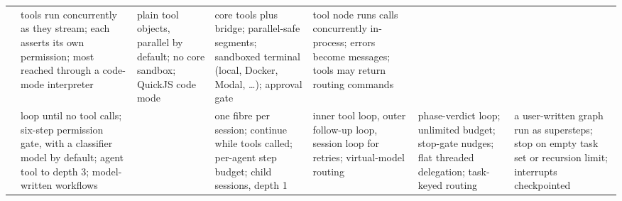 \begin{table}[p]
\begin{tabularx}{\linewidth}{@{}>{\bfseries}p{1.9cm}YYYYYY@{}}
 &
tools run concurrently as they stream; each asserts its own permission; most reached through a code-mode interpreter &
plain tool objects, parallel by default; no core sandbox; QuickJS code mode &
core tools plus bridge; parallel-safe segments; sandboxed terminal (local, Docker, Modal, \ldots); approval gate &
tool node runs calls concurrently in-process; errors become messages; tools may return routing commands \\
\addlinespace
{} &
loop until no tool calls; six-step permission gate, with a classifier model by default; agent tool to depth 3; model-written workflows &
 &
one fibre per session; continue while tools called; per-agent step budget; child sessions, depth 1 &
inner tool loop, outer follow-up loop, session loop for retries; virtual-model routing &
phase-verdict loop; unlimited budget; stop-gate nudges; flat threaded delegation; task-keyed routing &
a user-written graph run as supersteps; stop on empty task set or recursion limit; interrupts checkpointed \\
\bottomrule
\end{tabularx}
\end{table}
